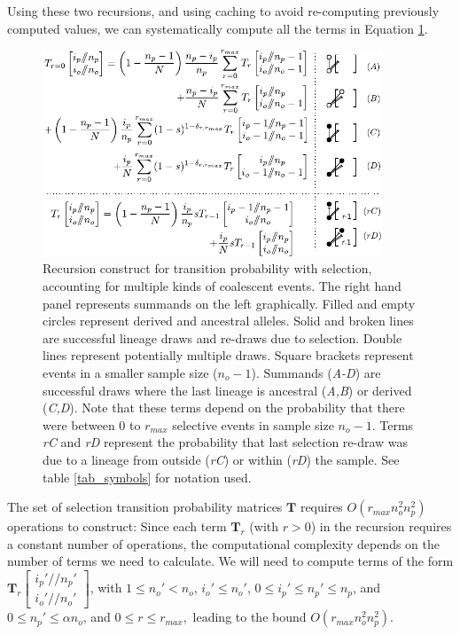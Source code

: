 \documentclass[review]{elsarticle}
\newcommand{\dslash}{/\!\!/}
\newcommand{\Coalc}[4]{\begin{bmatrix}#1\dslash #2 \\ #3\dslash #4 \end{bmatrix}}
\begin{document}
  
Using these two recursions, and using caching to avoid re-computing previously computed values,
we can systematically compute all the terms in Equation \ref{fig_rec_selection_dynamic_fail}.


\begin{figure}
  \centering
  \includegraphics[width=0.9\textwidth]{fig/recurrence-selection-dynamic-failures-annotated.pdf}

  \caption{Recursion construct for transition probability with selection, accounting for multiple
    kinds of coalescent events. The right hand panel represents summands on the left graphically.
    Filled and empty circles represent derived and ancestral alleles. Solid and broken lines are
    successful lineage draws and re-draws due to selection. Double lines represent potentially
    multiple draws. Square brackets represent events in a smaller sample size ($n_o-1$). Summands
    (\textit{A-D}) are successful draws where the last lineage is ancestral (\textit{A,B}) or
    derived (\textit{C,D}). Note that these terms depend on the probability that there were between
    $0$ to $r_{max}$ selective events in sample size $n_o-1$. Terms \textit{rC} and \textit{rD}
    represent the probability that last selection re-draw was due to a lineage from outside
    (\textit{rC}) or within (\textit{rD}) the sample. See table \ref{tab_symbols} for notation used.
  }

  \label{fig_rec_selection_dynamic_fail}
\end{figure}
 
The set of selection transition probability matrices $\mathbf{T}$ requires $O(r_{max}n_o^2 n_p^2)$
operations to construct: Since each term $\mathbf{T}_{r}$ (with $r>0$)  in the recursion requires a constant number of operations, 
the computational complexity depends on the number of terms we need to calculate. We will need to compute terms of the form 
 $\mathbf{T}_{r}\Coalc{i_p'}{n_p'}{i_o'}{n_o'}$, with $1 \leq n_o'<n_o$, $i_o' \leq n_o'$, $0\leq i_p' \leq n_p' \leq n_p$, and $0\leq n_p' \leq \alpha n_o$, 
 and $0\leq r \leq r_{max},$ leading to the bound $O(r_{max}n_o^2 n_p^2).$   
 
\end{document}
